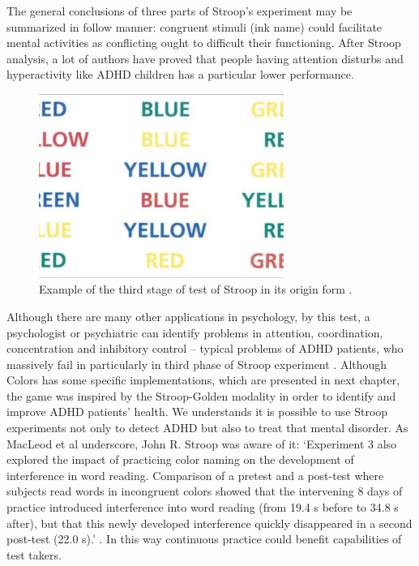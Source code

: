 The general conclusions of three parts of Stroop's experiment may be summarized in follow manner: congruent stimuli (ink name) could facilitate mental activities as conflicting ought to difficult their functioning. After Stroop analysis, a lot of authors have proved that people having attention disturbs and hyperactivity like ADHD children has a particular lower performance.

\begin{figure}[htp]
\begin{center}
  \includegraphics[width=8cm]{chapters/adhd/img/stroop.jpeg}
  \caption{Example of the third stage of test of Stroop in its origin form \citep{iStroop}.}
  \label{stroop}
\end{center}
\end{figure}


Although there are many other applications in psychology, by this test, a psychologist or psychiatric can identify problems in attention, coordination, concentration and inhibitory control -- typical problems of ADHD patients, who  massively fail in particularly in third phase of Stroop experiment \citep{lansbergen}. Although Colors has some specific implementations, which are presented in next chapter, the game was inspired by the Stroop-Golden modality in order to identify and improve ADHD patients' health. We understands it is possible to use Stroop experiments not only to detect ADHD but also to treat that mental disorder. As MacLeod et al underscore,  John R. Stroop was aware of it: `Experiment 3 also explored the impact of practicing color naming on the development of interference in word reading.  Comparison of a pretest and a post-test where subjects read words in incongruent colors showed that the intervening 8 days of practice introduced interference into word reading (from 19.4 s before to 34.8 s after), but that this newly developed interference quickly disappeared in a second post-test (22.0 s).' \citep{macleod}. In this way continuous practice could benefit capabilities of test takers.

